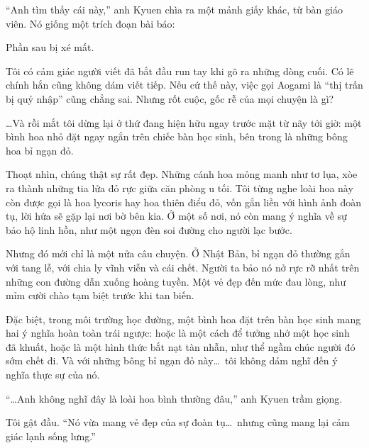 \documentclass[../main.tex]{subfiles}
\begin{document}
``Anh tìm thấy cái này,'' anh Kyuen chìa ra một mảnh giấy khác, từ bàn giáo viên. Nó giống một trích đoạn bài báo:


Phần sau bị xé mất.

Tôi có cảm giác người viết đã bắt đầu run tay khi gõ ra những dòng cuối. Có lẽ chính hắn cũng không dám viết tiếp. Nếu cứ thế này, việc gọi Aogami là ``thị trấn bị quỷ nhập'' cũng chẳng sai. Nhưng rốt cuộc, gốc rễ của mọi chuyện là gì?

\dots Và rồi mắt tôi dừng lại ở thứ đang hiện hữu ngay trước mặt từ nãy tới giờ: một bình hoa nhỏ đặt ngay ngắn trên chiếc bàn học sinh, bên trong là những bông hoa bỉ ngạn đỏ.


Thoạt nhìn, chúng thật sự rất đẹp. Những cánh hoa mỏng manh như tơ lụa, xòe ra thành những tia lửa đỏ rực giữa căn phòng u tối. Tôi từng nghe loài hoa này còn được gọi là hoa lycoris hay hoa thiên điểu đỏ, vốn gắn liền với hình ảnh đoàn tụ, lời hứa sẽ gặp lại nơi bờ bên kia. Ở một số nơi, nó còn mang ý nghĩa về sự bảo hộ linh hồn, như một ngọn đèn soi đường cho người lạc bước.

Nhưng đó mới chỉ là một nửa câu chuyện. Ở Nhật Bản, bỉ ngạn đỏ thường gắn với tang lễ, với chia ly vĩnh viễn và cái chết. Người ta bảo nó nở rực rỡ nhất trên những con đường dẫn xuống hoàng tuyền. Một vẻ đẹp đến mức đau lòng, như mỉm cười chào tạm biệt trước khi tan biến.

Đặc biệt, trong môi trường học đường, một bình hoa đặt trên bàn học sinh mang hai ý nghĩa hoàn toàn trái ngược: hoặc là một cách để tưởng nhớ một học sinh đã khuất, hoặc là một hình thức bắt nạt tàn nhẫn, như thể ngầm chúc người đó sớm chết đi. Và với những bông bỉ ngạn đỏ này\dots\ tôi không dám nghĩ đến ý nghĩa thực sự của nó.

``\dots Anh không nghĩ đây là loài hoa bình thường đâu,'' anh Kyuen trầm giọng.

Tôi gật đầu. ``Nó vừa mang vẻ đẹp của sự đoàn tụ\dots\ nhưng cũng mang lại cảm giác lạnh sống lưng.''
\end{document}
